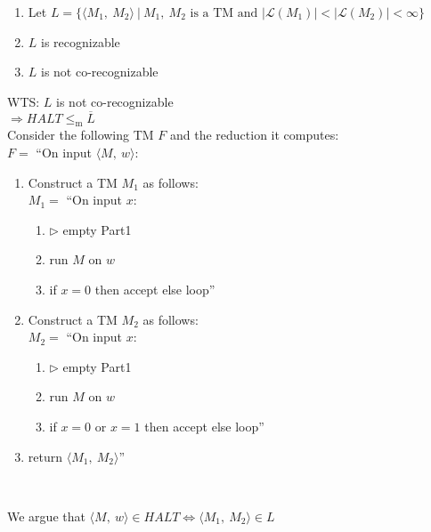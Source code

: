 \documentclass[preview]{standalone} %
\begin{document}
\begin{enumerate}
    \item Let $L=\{\langle M_1,\ M_2\rangle\ |\ M_1,\ M_2 \text{ is a TM and } |\mathcal{L}(M_1)| < |\mathcal{L}(M_2)| < \infty\}$
    \item $L$ is recognizable
    \item $L$ is not co-recognizable
\end{enumerate}

WTS: $L$ is not co-recognizable\\
$\Longrightarrow HALT \leq_\text{m} \overline{L}$\\

Consider the following TM $F$ and the reduction it computes:\\
$F=$ ``On input $\langle M,\ w\rangle$:
\begin{enumerate}[leftmargin=13mm, nosep, label=\textbf{\arabic*}.]
    \item Construct a TM $M_1$ as follows:\\
        $M_1 = $ ``On input $x$:
        \begin{enumerate}[leftmargin=15mm, nosep, label=\textbf{\arabic*}.]
            \item $\rhd$ empty Part1
            \item run $M$ on $w$
            \item if $x = 0$ then accept else loop''
        \end{enumerate}
    \item Construct a TM $M_2$ as follows:\\
        $M_2 = $ ``On input $x$:
        \begin{enumerate}[leftmargin=15mm, nosep, label=\textbf{\arabic*}.]
            \item $\rhd$ empty Part1
            \item run $M$ on $w$
            \item if $x = 0$ or $x = 1$ then accept else loop''
        \end{enumerate}
    \item return $\langle M_1,\ M_2\rangle$''
\end{enumerate}~

We argue that $\langle M,\ w\rangle \in HALT \Longleftrightarrow \langle M_1,\ M_2\rangle \in L$\\
\end{document}
